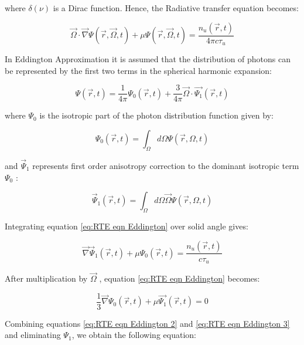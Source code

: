 \documentclass[paper=a4, fontsize=13pt]{scrartcl}
\begin{document}
where $\delta(\nu)$ is a Dirac function. Hence, the Radiative transfer equation becomes:

\begin{equation} \label{eq:RTE eqn Eddington}
\vec{\Omega} \cdot \vec{\nabla} \Psi(\vec{r},\vec{\Omega},t) + \mu\Psi(\vec{r},\vec{\Omega},t) = \frac{n_u (\vec{r},t)}{4 \pi c \tau_{u}}
\end{equation}

In Eddington Approximation it is assumed that the distribution of photons can be represented by the first two terms in the spherical harmonic expansion:

\begin{equation} \label{eq:Photon Distribution function Eddington}
\Psi(\vec{r},t) = \frac{1}{4\pi}\Psi_0(\vec{r},t) + \frac{3}{4\pi}\vec{\Omega} \cdot \vec{\Psi_1}(\vec{r},t) 
\end{equation} 

where $\Psi_0$ is the isotropic part of the photon distribution function given by:

\begin{equation}
\Psi_0(\vec{r},t) = \int_{\Omega}d\Omega\Psi(\vec{r},\Omega,t) 
\end{equation} 

and $\vec{\Psi}_1$ represents first order anisotropy correction to the dominant isotropic term $\Psi_0$ :

\begin{equation}
\vec{\Psi}_1(\vec{r},t) = \int_{\Omega}d\Omega \vec{\Omega}\Psi(\vec{r},\Omega,t) 
\end{equation} 

Integrating equation \ref{eq:RTE eqn Eddington} over solid angle gives:

\begin{equation} \label{eq:RTE eqn Eddington 2}
\vec{\nabla} \vec{\Psi}_1(\vec{r},t) + \mu\Psi_0(\vec{r},t) = \frac{n_u (\vec{r},t)}{c \tau_{u}}
\end{equation}

After multiplication by $\vec{\Omega}$ , equation \ref{eq:RTE eqn Eddington} becomes:

\begin{equation} \label{eq:RTE eqn Eddington 3}
\frac{1}{3}\vec{\nabla}\Psi_0(\vec{r},t) + \mu \vec{\Psi_1}(\vec{r},t) = 0
\end{equation} 

Combining equations \ref{eq:RTE eqn Eddington 2} and \ref{eq:RTE eqn Eddington 3} and eliminating $\Psi_1$, we obtain the following equation:
\end{document}
